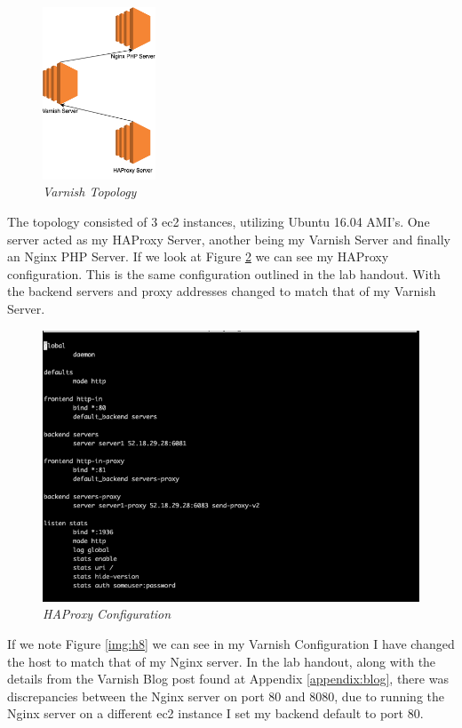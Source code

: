 \begin{figure}[!hb]
\centering
\includegraphics*[width=0.3\textwidth]{images/h93.png}
\caption{\em Varnish Topology}
\label{img:h93}
\end{figure}

The topology consisted of 3 ec2 instances, utilizing Ubuntu 16.04 AMI's. One server acted as my HAProxy Server, another being my Varnish Server and finally an Nginx PHP Server. If we look at Figure \ref{img:h7} we can see my HAProxy configuration. This is the same configuration outlined in the lab handout. With the backend servers and proxy addresses changed to match that of my Varnish Server.

\begin{figure}[!hb]
\centering
\includegraphics*[width=1\textwidth]{images/h7.png}
\caption{\em HAProxy Configuration}
\label{img:h7}
\end{figure}

If we note Figure \ref{img:h8} we can see in my Varnish Configuration I have changed the host to match that of my Nginx server. In the lab handout, along with the details from the Varnish Blog post found at Appendix \ref{appendix:blog}, there was discrepancies between the Nginx server on port 80 and 8080, due to running the Nginx server on a different ec2 instance I set my backend default to port 80.


